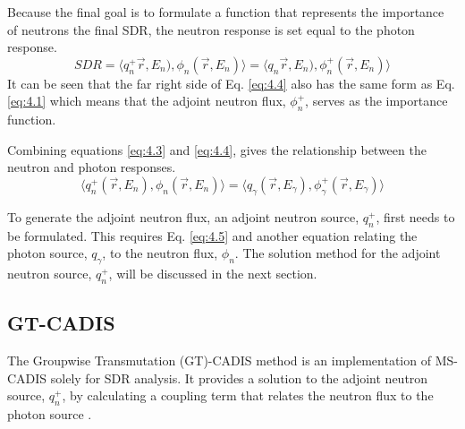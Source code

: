 Because the final goal is to formulate a function that represents the importance
of neutrons the final SDR, the
neutron response is set equal to the photon response.
\begin{equation} \label{eq:4.4}
  SDR =  \langle q_{n}^{+}\overrightarrow{r},E_{n}),
  \phi_{n}(\overrightarrow{r}, E_{n}) \rangle 
  = \langle q_{n}\overrightarrow{r},E_{n}),
  \phi_{n}^{+}(\overrightarrow{r}, E_{n}) \rangle 
\end{equation}
It can be seen that the far right side of Eq. \ref{eq:4.4} also has the same 
form as Eq. \ref{eq:4.1} which means that the adjoint neutron flux, $\phi_n^+$, 
serves as the importance function.

Combining equations \ref{eq:4.3} and \ref{eq:4.4}, 
gives the relationship between the neutron and photon responses.
\begin{equation} \label{eq:4.5}
	\langle q_{n}^{+}(\overrightarrow{r},E_{n}),
  \phi_{n}(\overrightarrow{r}, E_{n}) \rangle 
	= \langle q_{\gamma}(\overrightarrow{r},E_{\gamma}),
  \phi_{\gamma}^{+}(\overrightarrow{r}, E_{\gamma}) \rangle 
\end{equation}

To generate the adjoint neutron flux, 
an adjoint neutron source, $q_n^{+}$, first needs to be formulated.
This requires Eq. \ref{eq:4.5} and another equation
relating the photon source, $q_\gamma$, to the neutron flux, $\phi_n$.
The solution method for the adjoint neutron source, $q_n^+$, will be discussed in the 
next section.

\subsection{GT-CADIS}
The Groupwise Transmutation (GT)-CADIS method is an implementation of MS-CADIS
solely for SDR analysis.  It provides a solution to the adjoint neutron source, 
$q_n^+$, by calculating a coupling term that relates the neutron flux to the photon 
source \cite{gtcadis}.

